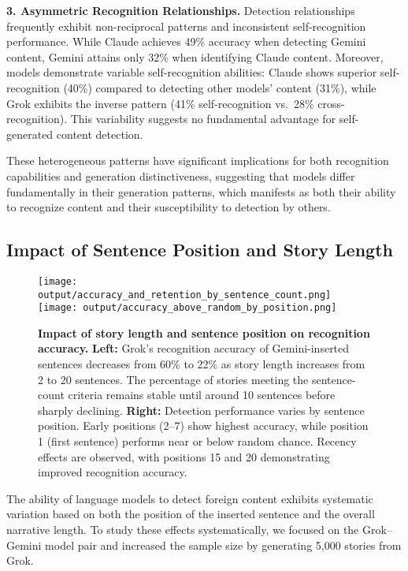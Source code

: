 \documentclass{article}
\begin{document}
\textbf{3. Asymmetric Recognition Relationships.} Detection relationships frequently exhibit non-reciprocal patterns and inconsistent self-recognition performance. While Claude achieves 49\% accuracy when detecting Gemini content, Gemini attains only 32\% when identifying Claude content. Moreover, models demonstrate variable self-recognition abilities: Claude shows superior self-recognition (40\%) compared to detecting other models' content (31\%), while Grok exhibits the inverse pattern (41\% self-recognition vs.\ 28\% cross-recognition). This variability suggests no fundamental advantage for self-generated content detection.

These heterogeneous patterns have significant implications for both recognition capabilities and generation distinctiveness, suggesting that models differ fundamentally in their generation patterns, which manifests as both their ability to recognize content and their susceptibility to detection by others.


\subsection{Impact of Sentence Position and Story Length}


\begin{figure}[ht]
    \texttt{[image: output/accuracy\_and\_retention\_by\_sentence\_count.png]}
    \texttt{[image: output/accuracy\_above\_random\_by\_position.png]}
\caption{
    \textbf{Impact of story length and sentence position on recognition accuracy.}
\textbf{Left:} Grok's recognition accuracy of Gemini-inserted sentences decreases from 60\% to 22\% as story length increases from 2 to 20 sentences. The percentage of stories meeting the sentence-count criteria remains stable until around 10 sentences before sharply declining.
    \textbf{Right:} Detection performance varies by sentence position. Early positions (2–7) show highest accuracy, while position 1 (first sentence) performs near or below random chance. Recency effects are observed, with positions 15 and 20 demonstrating improved recognition accuracy.
}
\label{fig:distribution_Predicted_Strange_Sentence_by_sentence_count}
\end{figure}


The ability of language models to detect foreign content exhibits systematic variation based on both the position of the inserted sentence and the overall narrative length. To study these effects systematically, we focused on the Grok–Gemini model pair and increased the sample size by generating 5,000 stories from Grok.
\end{document}
